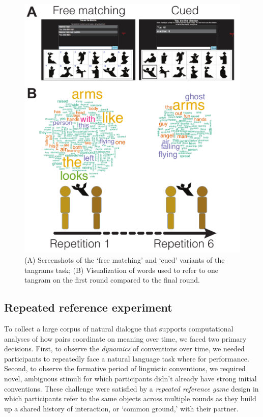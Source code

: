 \documentclass[alpha-refs]{wiley-article}
\begin{document}
\begin{figure}
\includegraphics[scale=.65]{designAndExample.pdf}
\caption{(A) Screenshots of the `free matching' and `cued' variants of the tangrams task; (B) Visualization of words used to refer to one tangram on the first round compared to the final round. }
\label{fig:design}
\end{figure}

\subsection{Repeated reference experiment}

To collect a large corpus of natural dialogue that supports computational analyses of how pairs coordinate on meaning over time, we faced two primary decisions.
First, to observe the \emph{dynamics} of conventions over time, we needed participants to repeatedly face a natural language task where  for performance.
Second, to observe the formative period of linguistic conventions, we required novel, ambiguous stimuli for which participants didn't already have strong initial conventions.
These challenge were satisfied by a \emph{repeated reference game} design in which participants refer to the same objects across multiple rounds as they build up a shared history of interaction, or ‘common ground,’ with their partner. 
\end{document}
